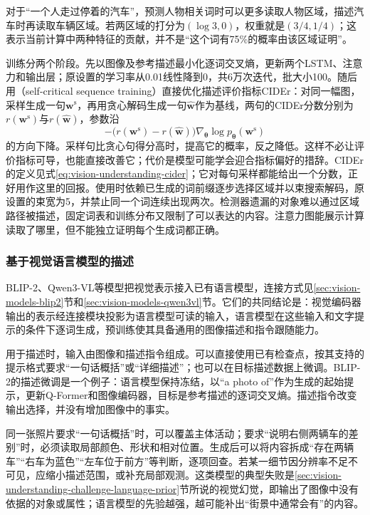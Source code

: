 对于“一个人走过停着的汽车”，预测人物相关词时可以更多读取人物区域，描述汽车时再读取车辆区域。若两区域的打分为$(\log3,0)$，权重就是$(3/4,1/4)$；这表示当前计算中两种特征的贡献，并不是“这个词有75\%的概率由该区域证明”。

训练分两个阶段。先以图像及参考描述最小化逐词交叉熵，更新两个LSTM、注意力和输出层；原设置的学习率从0.01线性降到0，共6万次迭代，批大小100。随后用（self-critical sequence training）直接优化描述评价指标CIDEr：对同一幅图，采样生成一句$\bm w^{\mathrm s}$，再用贪心解码生成一句$\hat{\bm w}$作为基线，两句的CIDEr分数分别为$r(\bm w^{\mathrm s})$与$r(\hat{\bm w})$，参数沿
\begin{equation}
  -\bigl(r(\bm w^{\mathrm s})-r(\hat{\bm w})\bigr)\nabla_{\bm\theta}\log p_{\bm\theta}(\bm w^{\mathrm s})
  \label{eq:vision-scst}
\end{equation}
的方向下降。采样句比贪心句得分高时，提高它的概率，反之降低。这样不必让评价指标可导，也能直接改善它；代价是模型可能学会迎合指标偏好的措辞。CIDEr的定义见式\eqref{eq:vision-understanding-cider}；它对每句采样都能给出一个分数，正好用作这里的回报。使用时依赖已生成的词前缀逐步选择区域并以束搜索解码，原设置的束宽为5，并禁止同一个词连续出现两次。检测器遗漏的对象难以通过区域路径被描述，固定词表和训练分布又限制了可以表达的内容。注意力图能展示计算读取了哪里，但不能独立证明每个生成词都正确。

\subsubsection{基于视觉语言模型的描述}
\label{sec:vision-understanding-vlm-caption}

BLIP-2、Qwen3-VL等模型把视觉表示接入已有语言模型，连接方式见\ref{sec:vision-models-blip2}节和\ref{sec:vision-models-qwen3vl}节。它们的共同结论是：视觉编码器输出的表示经连接模块投影为语言模型可读的输入，语言模型在这些输入和文字提示的条件下逐词生成，预训练使其具备通用的图像描述和指令跟随能力。

用于描述时，输入由图像和描述指令组成。可以直接使用已有检查点，按其支持的提示格式要求“一句话概括”或“详细描述”；也可以在目标描述数据上微调。BLIP-2的描述微调是一个例子：语言模型保持冻结，以“a photo of”作为生成的起始提示，更新Q-Former和图像编码器，目标是参考描述的逐词交叉熵。描述指令改变输出选择，并没有增加图像中的事实。

同一张照片要求“一句话概括”时，可以覆盖主体活动；要求“说明右侧两辆车的差别”时，必须读取局部颜色、形状和相对位置。生成后可以将内容拆成“存在两辆车”“右车为蓝色”“左车位于前方”等判断，逐项回查。若某一细节因分辨率不足不可见，应缩小描述范围，或补充局部观测。这类模型的典型失败是\ref{sec:vision-understanding-challenge-language-prior}节所说的视觉幻觉，即输出了图像中没有依据的对象或属性；语言模型的先验越强，越可能补出“街景中通常会有”的内容。

